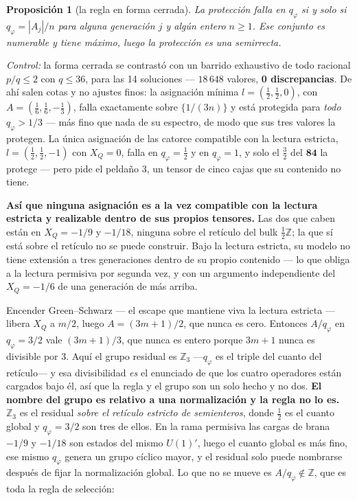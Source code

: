 \documentclass[11pt,a4paper]{article}
\newtheorem{proposition}{Proposición}
\newcommand{\ZZ}{\mathbb{Z}}
\newcommand{\rep}[1]{\mathbf{#1}}
\newenvironment{keyeq}
  {\begin{center}\setlength{\fboxsep}{9pt}\setlength{\fboxrule}{0.8pt}%
   \begin{lrbox}{\keyeqbox}\begin{minipage}{0.88\textwidth}}
  {\end{minipage}\end{lrbox}%
   \fcolorbox{hdrblue!55}{hdrblue!6}{\usebox{\keyeqbox}}\end{center}}
\begin{document}
\begin{proposition}[la regla en forma cerrada]\label{prop:closed}
La protección falla en $q_\varphi$ si y solo si $q_\varphi=|A_j|/n$ para alguna generación $j$ y
algún entero $n\ge1$. Ese conjunto es numerable y tiene \emph{máximo}, luego la protección es una
semirrecta.
\end{proposition}

\emph{Control:} la forma cerrada se contrastó con un barrido exhaustivo de todo racional $p/q\le2$
con $q\le36$, para las 14 soluciones --- $18\,648$ valores, \textbf{0 discrepancias}. De ahí salen
cotas y no ajustes finos: la asignación mínima $l=(\tfrac12,\tfrac12,0)$, con
$A=(\tfrac16,\tfrac16,-\tfrac13)$, falla exactamente sobre $\{1/(3n)\}$ y está protegida para
\emph{todo} $q_\varphi>1/3$ --- más fino que nada de su espectro, de modo que sus tres valores la
protegen. La única asignación de las catorce compatible con la lectura estricta,
$l=(\tfrac12,\tfrac12,-1)$ con $X_Q=0$, falla en $q_\varphi=\tfrac12$ y en $q_\varphi=1$, y solo el
$\tfrac32$ del $\rep{84}$ la protege --- pero pide el peldaño $3$, un tensor de cinco cajas que su
contenido no tiene.

\begin{keyeq}
\textbf{Así que ninguna asignación es a la vez compatible con la lectura estricta y realizable dentro
de sus propios tensores.} Las dos que caben están en $X_Q=-1/9$ y $-1/18$, ninguna sobre el retículo
del bulk $\tfrac12\ZZ$; la que sí está sobre el retículo no se puede construir. Bajo la lectura
estricta, su modelo no tiene extensión a tres generaciones dentro de su propio contenido --- lo que
obliga a la lectura permisiva por segunda vez, y con un argumento independiente del $X_Q=-1/6$ de una
generación de más arriba.
\end{keyeq}

Encender Green--Schwarz --- el escape que mantiene viva la lectura estricta --- libera $X_Q$ a $m/2$,
luego $A=(3m+1)/2$, que nunca es cero. Entonces $A/q_\varphi$ en $q_\varphi=3/2$ vale $(3m+1)/3$, que
nunca es entero porque $3m+1$ nunca es divisible por $3$. Aquí el grupo residual es $\ZZ_3$
---$q_\varphi$ es el triple del cuanto del retículo--- y esa divisibilidad \emph{es} el enunciado de
que los cuatro operadores están cargados bajo él, así que la regla y el grupo son un solo hecho y no
dos. \textbf{El nombre del grupo es relativo a una normalización y la regla no lo es.} $\ZZ_3$ es el
residual \emph{sobre el retículo estricto de semienteros}, donde $\tfrac12$ es el cuanto global y
$q_\varphi=3/2$ son tres de ellos. En la rama permisiva las cargas de brana $-1/9$ y $-1/18$ son
estados del mismo $U(1)'$, luego el cuanto global es más fino, ese mismo $q_\varphi$ genera un grupo
cíclico mayor, y el residual solo puede nombrarse después de fijar la normalización global. Lo que no
se mueve es $A/q_\varphi\notin\ZZ$, que es toda la regla de selección:
\end{document}
